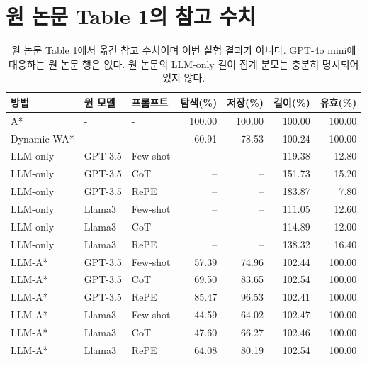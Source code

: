 \documentclass[11pt]{article}
\begin{document}
\appendix
\begin{table}[t]
\section{원 논문 Table 1의 참고 수치}\label{app:paper}
\centering\small
\begin{tabular}{lllrrrr}
\toprule
방법 & 원 모델 & 프롬프트 & 탐색(\%) & 저장(\%) & 길이(\%) & 유효(\%)\\
\midrule
A* & - & - & 100.00 & 100.00 & 100.00 & 100.00 \\
Dynamic WA* & - & - & 60.91 & 78.53 & 100.24 & 100.00 \\
LLM-only & GPT-3.5 & Few-shot & -- & -- & 119.38 & 12.80 \\
LLM-only & GPT-3.5 & CoT & -- & -- & 151.73 & 15.20 \\
LLM-only & GPT-3.5 & RePE & -- & -- & 183.87 & 7.80 \\
LLM-only & Llama3 & Few-shot & -- & -- & 111.05 & 12.60 \\
LLM-only & Llama3 & CoT & -- & -- & 114.89 & 12.00 \\
LLM-only & Llama3 & RePE & -- & -- & 138.32 & 16.40 \\
LLM-A* & GPT-3.5 & Few-shot & 57.39 & 74.96 & 102.44 & 100.00 \\
LLM-A* & GPT-3.5 & CoT & 69.50 & 83.65 & 102.54 & 100.00 \\
LLM-A* & GPT-3.5 & RePE & 85.47 & 96.53 & 102.41 & 100.00 \\
LLM-A* & Llama3 & Few-shot & 44.59 & 64.02 & 102.47 & 100.00 \\
LLM-A* & Llama3 & CoT & 47.60 & 66.27 & 102.46 & 100.00 \\
LLM-A* & Llama3 & RePE & 64.08 & 80.19 & 102.54 & 100.00 \\
\bottomrule
\end{tabular}
\caption{원 논문 Table 1에서 옮긴 참고 수치이며 이번 실험 결과가 아니다. GPT-4o mini에 대응하는 원 논문 행은 없다. 원 논문의 LLM-only 길이 집계 분모는 충분히 명시되어 있지 않다.}
\end{table}
\end{document}
